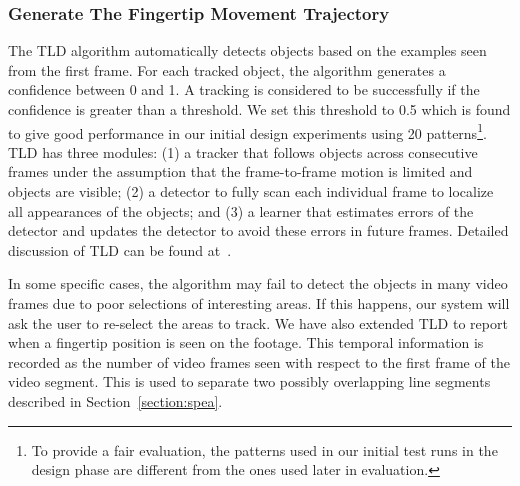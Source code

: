     \subsubsection{Generate The Fingertip Movement Trajectory}

        The TLD algorithm automatically detects
        objects based on the examples seen from the first frame.
        For each tracked object, the algorithm generates a confidence between 0 and 1.
        A tracking is considered to be successfully if the confidence is greater than a threshold.
        We set this threshold to 0.5 which is found to give good performance in our initial design experiments using 20 patterns\footnote{To provide a fair evaluation, the patterns used in
        our initial test runs in the design phase are different from the ones used later in evaluation.}.
        TLD has three modules: (1) a tracker that follows
        objects across consecutive frames under the assumption
        that the frame-to-frame motion is limited and objects are visible;
        (2) a detector to fully scan each individual frame to localize all
        appearances of the objects; and
        (3) a learner that estimates errors of the detector and updates the detector to avoid these errors in future
        frames.
        Detailed discussion of TLD can be found
        at~\cite{kalal2012tracking}.

         In some specific cases, the algorithm may fail to detect the objects in many video frames due to poor selections of interesting areas. If this happens, our system will ask the user to re-select the areas to track.
        We have also extended TLD to report when a
        fingertip position is seen on the footage. This temporal information is recorded as the number
        of video frames seen with respect to the first frame of the video segment.
        This is used to separate two possibly overlapping line segments described in Section~\ref{section:spea}.



